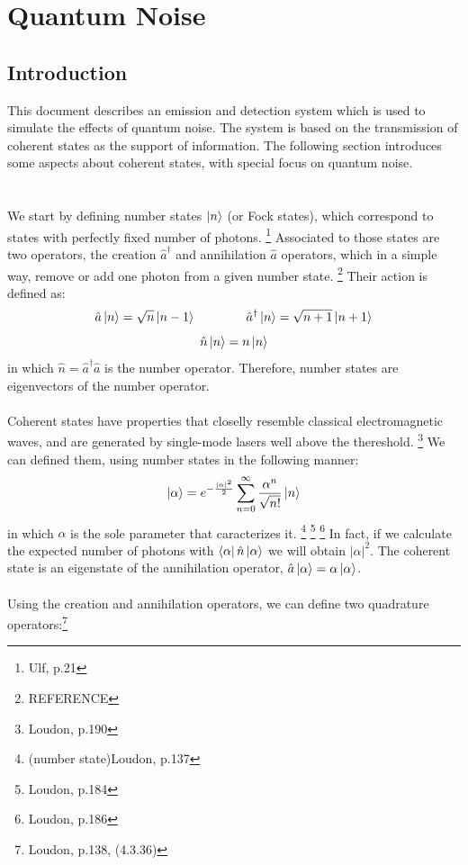 \clearpage
\section{Quantum Noise}

\subsection*{Introduction}\label{sec:intro}


This document describes an emission and detection system which is used to simulate the effects of quantum noise. The system is based on the transmission of coherent states as the support of information. The following section introduces some aspects about coherent states, with special focus on quantum noise.\\
\\
\\
We start by defining number states $\ket{n}$ (or Fock states), which correspond to states with perfectly fixed number of photons.
\footnote{Ulf, p.21}
Associated to those states are two operators, the creation $\hat{a}^\dagger$ and annihilation $\hat{a}$ operators, which in a simple way, remove or add one photon from a given number state.
\footnote{REFERENCE}
Their action is defined as:
$$
\hat{a} \ket{n} = \sqrt{n} \ket{n-1} \qquad \qquad
\hat{a}^\dagger \ket{n} = \sqrt{n+1} \ket{n+1}
$$
$$
\hat{n} \ket{n} = n \ket{n}
$$
in which $\hat{n} = \hat{a}^\dagger\hat{a}$ is the number operator. Therefore, number states are eigenvectors of the number operator.\\
\\
Coherent states have properties that closelly resemble classical electromagnetic waves, and are generated by single-mode lasers well above the thereshold.
\footnote{Loudon, p.190}
We can defined them, using number states in the following manner:
$$
\ket{\alpha} = e^{-\frac{|\alpha|^2}{2}} \sum_{n=0}^\infty \frac{\alpha^n}{\sqrt{n!}} \ket{n}
$$
in which $\alpha$ is the sole parameter that caracterizes it.
\footnote{(number state)Loudon, p.137}
\footnote{Loudon, p.184}
\footnote{Loudon, p.186}
In fact, if we calculate the expected number of photons with $\bra{\alpha} \hat{n} \ket{\alpha}$ we will obtain $|\alpha|^2$. The coherent state is an eigenstate of the annihilation operator, $\hat{a}\ket{\alpha} = \alpha \ket{\alpha}$.\\
\\
%
%
Using the creation and annihilation operators, we can define two quadrature operators:\footnote{Loudon, p.138, (4.3.36)}

